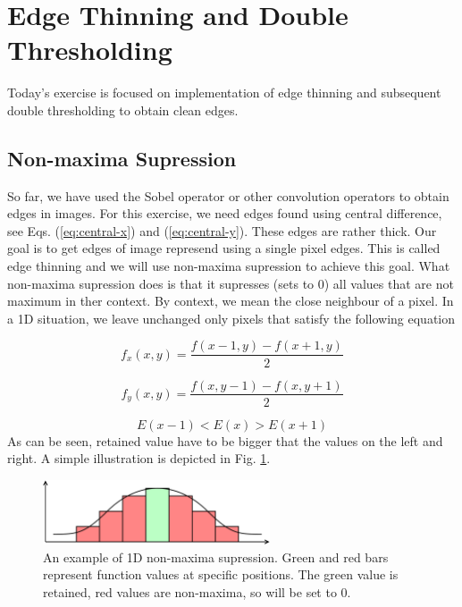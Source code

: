 \documentclass[12pt]{article}
\begin{document}
\section*{Edge Thinning and Double Thresholding}

Today's exercise is focused on implementation of edge thinning and subsequent double thresholding to obtain clean edges.

\subsection*{Non-maxima Supression}

So far, we have used the Sobel operator or other convolution operators to obtain edges in images.
For this exercise, we need edges found using central difference, see Eqs. (\ref{eq:central-x}) and (\ref{eq:central-y}).
These edges are rather thick.
Our goal is to get edges of image represend using a single pixel edges.
This is called edge thinning and we will use non-maxima supression to achieve this goal.
What non-maxima supression does is that it supresses (sets to $0$) all values that are not maximum in ther context.
By context, we mean the close neighbour of a pixel.
In a 1D situation, we leave unchanged only pixels that satisfy the following equation

\begin{equation} \label{eq:central-x}
    f_x(x, y) = \frac{f(x - 1, y) - f(x + 1, y)}{2}
\end{equation}

\begin{equation} \label{eq:central-y}
    f_y(x, y) = \frac{f(x, y - 1) - f(x, y + 1)}{2}
\end{equation}

\begin{equation} \label{eq:max_1d}
    E(x - 1) < E(x) > E(x + 1)
\end{equation}
As can be seen, retained value have to be bigger that the values on the left and right.
A simple illustration is depicted in Fig. \ref{fig:non-maxima-supression-1d}.

\begin{figure}[h]
\begin{centering}
    \includegraphics[width=0.6\textwidth]{non_maxima_supression_1d}
    \caption{An example of 1D non-maxima supression. Green and red bars represent function values at specific positions. The green value is retained, red values are non-maxima, so will be set to 0.}
    \label{fig:non-maxima-supression-1d}
\end{centering}
\end{figure}
\end{document}

